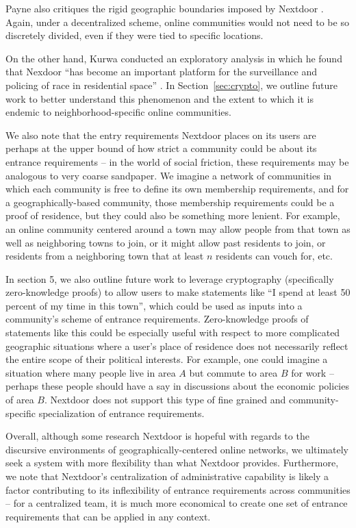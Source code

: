 \documentclass[sigconf,authordraft]{acmart}
\begin{document}
Payne also critiques the rigid geographic boundaries imposed by Nextdoor \cite{payne2017welcome}. Again, under a decentralized scheme, online communities would not need to be so discretely divided, even if they were tied to specific locations.


On the other hand, Kurwa conducted an exploratory analysis in which he found that Nexdoor ``has
become an important platform for the surveillance and policing of race in residential space''
\cite{kurwa2019building}. In Section~\ref{sec:crypto}, we outline future work to better understand
this phenomenon and the extent to which it is endemic to neighborhood-specific online communities.

We also note that the entry requirements Nextdoor places on its users are perhaps at the upper bound of how strict a community could be about its entrance requirements -- in the world of social friction, these requirements may be analogous to very coarse sandpaper. We imagine a network of communities in which each community is free to define its own membership requirements, and for a geographically-based community, those membership requirements could be a proof of residence, but they could also be something more lenient. For example, an online community centered around a town may allow people from that town as well as neighboring towns to join, or it might allow past residents to join, or residents from a neighboring town that at least $n$ residents can vouch for, etc. 

In section 5, we also outline future work to leverage cryptography (specifically zero-knowledge proofs) to allow users to make statements like ``I spend at least 50 percent of my time in this town'', which could be used as inputs into a community's scheme of entrance requirements. Zero-knowledge proofs of statements like this could be especially useful with respect to more complicated geographic situations where a user's place of residence does not necessarily reflect the entire scope of their political interests. For example, one could imagine a situation where many people live in area $A$ but commute to area $B$ for work -- perhaps these people should have a say in discussions about the economic policies of area $B$. Nextdoor does not support this type of fine grained and community-specific specialization of entrance requirements.

Overall, although some research Nextdoor is hopeful with regards to the discursive environments of geographically-centered online networks, we ultimately seek a system with more flexibility than what Nextdoor provides. Furthermore, we note that Nextdoor's centralization of administrative capability is likely a factor contributing to its inflexibility of entrance requirements across communities -- for a centralized team, it is much more economical to create one set of entrance requirements that can be applied in any context.
\end{document}
